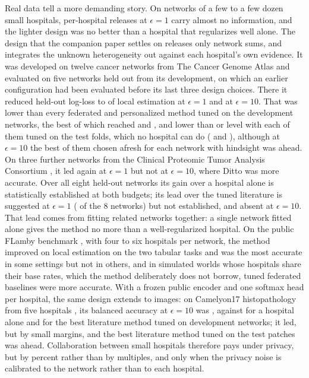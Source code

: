 \documentclass[acmsmall,screen,review]{acmart}
\theoremstyle{acmdefinition}
\begin{document}
Real data tell a more demanding story. On networks of a few to a few dozen small hospitals, per-hospital releases at $\epsilon=1$ carry almost no information, and the lighter design was no better than a hospital that regularizes well alone. The design that the companion paper settles on releases only network sums, and integrates the unknown heterogeneity out against each hospital's own evidence. It was developed on twelve cancer networks from The Cancer Genome Atlas and evaluated on five networks held out from its development, on which an earlier configuration had been evaluated before its last three design choices. There it reduced held-out log-loss to \SimTCOneGHB{} of local estimation at $\epsilon=1$ and \SimTCTenGHB{} at $\epsilon=10$. That was lower than every federated and personalized method tuned on the development networks, the best of which reached \SimTCOneFT{} and \SimTCTenDitto, and lower than or level with each of them tuned on the test folds, which no hospital can do (\SimTCOneFTOrc{} and \SimTCTenDittoOrc), although at $\epsilon=10$ the best of them chosen afresh for each network with hindsight was ahead. On three further networks from the Clinical Proteomic Tumor Analysis Consortium \cite{edwards2015cptac}, it led again at $\epsilon=1$ but not at $\epsilon=10$, where Ditto was more accurate. Over all eight held-out networks its gain over a hospital alone is statistically established at both budgets; its lead over the tuned literature is suggested at $\epsilon=1$ (\SimStHOneRealWins{} of the 8 networks) but not established, and absent at $\epsilon=10$. That lead comes from fitting related networks together: a single network fitted alone gives the method no more than a well-regularized hospital. On the public FLamby benchmark \cite{ogierduterrail2022flamby}, with four to six hospitals per network, the method improved on local estimation on the two tabular tasks and was the most accurate in some settings but not in others, and in simulated worlds whose hospitals share their base rates, which the method deliberately does not borrow, tuned federated baselines were more accurate. With a frozen public encoder \cite{tan2019efficientnet} and one softmax head per hospital, the same design extends to images: on Camelyon17 histopathology from five hospitals \cite{bandi2019camelyon17}, its balanced accuracy at $\epsilon=10$ was \SimCamTenGHB, against \SimCamLocal{} for a hospital alone and \SimCamTenBestReal{} for the best literature method tuned on development networks; it led, but by small margins, and the best literature method tuned on the test patches was ahead. Collaboration between small hospitals therefore pays under privacy, but by percent rather than by multiples, and only when the privacy noise is calibrated to the network rather than to each hospital.
\end{document}
